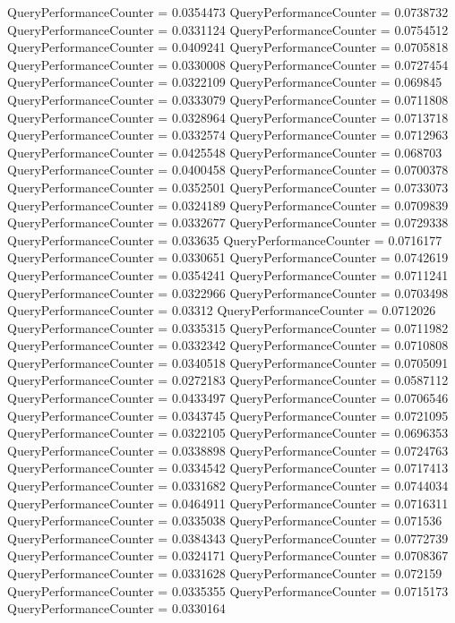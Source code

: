 \documentclass[9pt]{article}
\theoremstyle{plain}
\theoremstyle{definition}
\theoremstyle{remark}
\numberwithin{equation}{section}
\begin{document}
QueryPerformanceCounter  =  0.0354473
QueryPerformanceCounter  =  0.0738732
QueryPerformanceCounter  =  0.0331124
QueryPerformanceCounter  =  0.0754512
QueryPerformanceCounter  =  0.0409241
QueryPerformanceCounter  =  0.0705818
QueryPerformanceCounter  =  0.0330008
QueryPerformanceCounter  =  0.0727454
QueryPerformanceCounter  =  0.0322109
QueryPerformanceCounter  =  0.069845
QueryPerformanceCounter  =  0.0333079
QueryPerformanceCounter  =  0.0711808
QueryPerformanceCounter  =  0.0328964
QueryPerformanceCounter  =  0.0713718
QueryPerformanceCounter  =  0.0332574
QueryPerformanceCounter  =  0.0712963
QueryPerformanceCounter  =  0.0425548
QueryPerformanceCounter  =  0.068703
QueryPerformanceCounter  =  0.0400458
QueryPerformanceCounter  =  0.0700378
QueryPerformanceCounter  =  0.0352501
QueryPerformanceCounter  =  0.0733073
QueryPerformanceCounter  =  0.0324189
QueryPerformanceCounter  =  0.0709839
QueryPerformanceCounter  =  0.0332677
QueryPerformanceCounter  =  0.0729338
QueryPerformanceCounter  =  0.033635
QueryPerformanceCounter  =  0.0716177
QueryPerformanceCounter  =  0.0330651
QueryPerformanceCounter  =  0.0742619
QueryPerformanceCounter  =  0.0354241
QueryPerformanceCounter  =  0.0711241
QueryPerformanceCounter  =  0.0322966
QueryPerformanceCounter  =  0.0703498
QueryPerformanceCounter  =  0.03312
QueryPerformanceCounter  =  0.0712026
QueryPerformanceCounter  =  0.0335315
QueryPerformanceCounter  =  0.0711982
QueryPerformanceCounter  =  0.0332342
QueryPerformanceCounter  =  0.0710808
QueryPerformanceCounter  =  0.0340518
QueryPerformanceCounter  =  0.0705091
QueryPerformanceCounter  =  0.0272183
QueryPerformanceCounter  =  0.0587112
QueryPerformanceCounter  =  0.0433497
QueryPerformanceCounter  =  0.0706546
QueryPerformanceCounter  =  0.0343745
QueryPerformanceCounter  =  0.0721095
QueryPerformanceCounter  =  0.0322105
QueryPerformanceCounter  =  0.0696353
QueryPerformanceCounter  =  0.0338898
QueryPerformanceCounter  =  0.0724763
QueryPerformanceCounter  =  0.0334542
QueryPerformanceCounter  =  0.0717413
QueryPerformanceCounter  =  0.0331682
QueryPerformanceCounter  =  0.0744034
QueryPerformanceCounter  =  0.0464911
QueryPerformanceCounter  =  0.0716311
QueryPerformanceCounter  =  0.0335038
QueryPerformanceCounter  =  0.071536
QueryPerformanceCounter  =  0.0384343
QueryPerformanceCounter  =  0.0772739
QueryPerformanceCounter  =  0.0324171
QueryPerformanceCounter  =  0.0708367
QueryPerformanceCounter  =  0.0331628
QueryPerformanceCounter  =  0.072159
QueryPerformanceCounter  =  0.0335355
QueryPerformanceCounter  =  0.0715173
QueryPerformanceCounter  =  0.0330164
\end{document}
